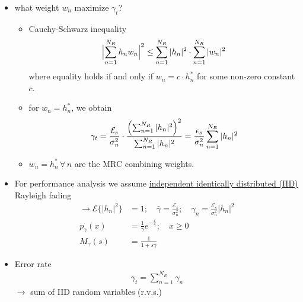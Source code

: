 \documentclass[a4paper, 10pt]{article}
\begin{document}
\begin{itemize}
	\item what weight \begin{math}w_n\end{math} maximize \begin{math}\gamma _t\end{math}?
	\begin{itemize}
		\item Cauchy-Schwarz inequality
		\begin{align*}
			\Bigl | \sum_{n = 1}^{N_R}h_nw_n\Bigr |^2 \leq \sum_{n = 1}^{N_R}|h_n|^2 \cdot \sum_{n = 1}^{N_R}|w_n|^2
		\end{align*}
	where equality holds if and only if \begin{math}w_n = c\cdot h_n^*\end{math} for some non-zero constant \begin{math}c\end{math}.
		\item for \begin{math}w_n = h_n^*\end{math}, we obtain
		\begin{align*}
			\gamma _t = \frac{\mathcal{E}_s}{\sigma _n^2}\cdot \frac{\Bigl ( \sum_{n = 1}^{N_R}|h_n|^2\Bigr ) ^2}{\sum_{n = 1}^{N_R}|h_n|^2} = \frac{\epsilon _s}{\sigma _n^2}\sum_{n = 1}^{N_R}|h_n|^2
		\end{align*}
		\item \begin{math}w_n = h_n^*\, \forall \, n\end{math} are the MRC combining weights.	
	\end{itemize}
	\item For performance analysis we assume \underline{independent identically distributed (IID)} Rayleigh fading
		\begin{align*}
			\rightarrow \mathcal{E}\{|h_n|^2\} &= 1; \quad \bar{\gamma} = \frac{\mathcal{E}_s}{\sigma	_n^2}; \quad \gamma _n = \frac{\mathcal{E}_s}{\sigma _n^2}|h_n|^2\\
			p_{\gamma}(x) &= \frac{1}{\bar{\gamma}}e^{-\frac{x}{\bar{\gamma}}}; \quad x\geq 0\\
			M_{\gamma}(s) &= \frac{1}{1+s\bar{\gamma}}
		\end{align*}		
	\item Error rate
			\begin{align*}
				\gamma _t = \sum_{n = 1}^{N_R}\gamma _n
			\end{align*}
			\begin{math}\rightarrow \end{math} sum of IID random variables (r.v.s.)

\end{itemize}
\end{document}
